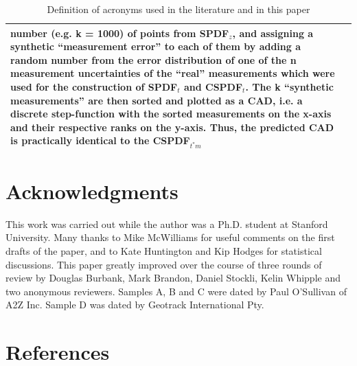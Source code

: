 \documentclass[12pt,twoside]{article}
\begin{document}
\begin{table}[here]
\begin{footnotesize}
\begin{tabular}[]{|p{}|p{}|}
  number (e.g.  k  = 1000) of points from  SPDF$_{z}$, and assigning a
  synthetic ``measurement error''  to each of them by  adding a random
  number  from the  error distribution  of  one of  the n  measurement
  uncertainties of  the ``real'' measurements which were  used for the
  construction  of  SPDF$_{t}$  and  CSPDF$_{t}$.  The  k  ``synthetic
  measurements'' are  then sorted and plotted  as a CAD,  i.e.  
a discrete step-function with the sorted measurements 
on the x-axis and their respective ranks on the y-axis.  
Thus, the predicted CAD is practically identical to the CSPDF$_{t^*m}$\\
\hline\hline
  \end{tabular}
\end{footnotesize}
  \caption{Definition of acronyms used in the literature and in this paper}
  \label{tab:definitions}
\end{table}

\section*{Acknowledgments}

This work  was carried out  while the author  was a Ph.D.   student at
Stanford  University.   Many  thanks  to Mike  McWilliams  for  useful
comments on the first drafts of  the paper, and to Kate Huntington and
Kip Hodges  for statistical discussions.  This  paper greatly improved
over the  course of  three rounds of  review by Douglas  Burbank, Mark
Brandon, Daniel  Stockli, Kelin Whipple  and two anonymous  reviewers. 
Samples A, B and C were dated by Paul O'Sullivan of A2Z Inc.  Sample D
was dated by Geotrack International Pty.

\section*{References}
\end{document}
